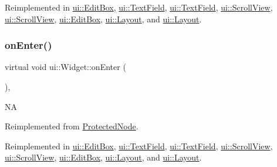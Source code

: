 Reimplemented in \hyperlink{classui_1_1EditBox_a0506cfa2b498d2bcd24c4b85deff123d}{ui\+::\+Edit\+Box}, \hyperlink{classui_1_1TextField_a8798bcf6c7f3540b7c078338386c04a3}{ui\+::\+Text\+Field}, \hyperlink{classui_1_1TextField_ad7a8241c7d1a80bc8821e67044ffa20c}{ui\+::\+Text\+Field}, \hyperlink{classui_1_1ScrollView_afeb85b1cf1e420b57a66c97c08763138}{ui\+::\+Scroll\+View}, \hyperlink{classui_1_1ScrollView_a1fb1c9ad9108d8c0102af82bfb7ef66d}{ui\+::\+Scroll\+View}, \hyperlink{classui_1_1EditBox_a04667a919ce4f36fefb7605215267b28}{ui\+::\+Edit\+Box}, \hyperlink{classui_1_1Layout_ad3edf411791596999e99059861c0097a}{ui\+::\+Layout}, and \hyperlink{classui_1_1Layout_a13b57bb4cec0d694e8053c393499d8b2}{ui\+::\+Layout}.

\mbox{\label{classui_1_1Widget_a1df4415ad57003db87a5e9b069b56956}} 
\subsubsection{\texorpdfstring{on\+Enter()}{onEnter()}\hspace{0.1cm}{\footnotesize\ttfamily [2/2]}}
{\footnotesize\ttfamily virtual void ui\+::\+Widget\+::on\+Enter (\begin{DoxyParamCaption}{ }\end{DoxyParamCaption})\hspace{0.3cm}{\ttfamily [override]}, {\ttfamily [virtual]}}

NA 

Reimplemented from \hyperlink{classProtectedNode_ade991090bee4173b4e1f47382adc99b9}{Protected\+Node}.



Reimplemented in \hyperlink{classui_1_1EditBox_a0506cfa2b498d2bcd24c4b85deff123d}{ui\+::\+Edit\+Box}, \hyperlink{classui_1_1TextField_a8798bcf6c7f3540b7c078338386c04a3}{ui\+::\+Text\+Field}, \hyperlink{classui_1_1TextField_ad7a8241c7d1a80bc8821e67044ffa20c}{ui\+::\+Text\+Field}, \hyperlink{classui_1_1ScrollView_afeb85b1cf1e420b57a66c97c08763138}{ui\+::\+Scroll\+View}, \hyperlink{classui_1_1ScrollView_a1fb1c9ad9108d8c0102af82bfb7ef66d}{ui\+::\+Scroll\+View}, \hyperlink{classui_1_1EditBox_a04667a919ce4f36fefb7605215267b28}{ui\+::\+Edit\+Box}, \hyperlink{classui_1_1Layout_ad3edf411791596999e99059861c0097a}{ui\+::\+Layout}, and \hyperlink{classui_1_1Layout_a13b57bb4cec0d694e8053c393499d8b2}{ui\+::\+Layout}.

